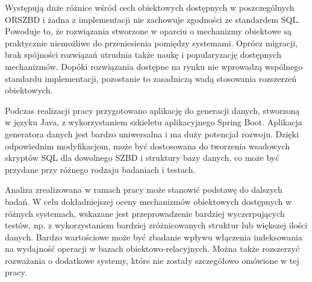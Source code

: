 \documentclass[a4paper,twoside,12pt]{book}
\begin{document}
Występują duże różnice wśród cech obiektowych dostępnych w poszczególnych ORSZBD i żadna z implementacji nie zachowuje zgodności ze standardem SQL. Powoduje to, że rozwiązania stworzone w oparciu o mechanizmy obiektowe są praktycznie niemożliwe do przeniesienia pomiędzy systemami. Oprócz migracji, brak spójności rozwiązań utrudnia także naukę i popularyzację dostępnych mechanizmów. Dopóki rozwiązania dostępne na rynku nie wprowadzą wspólnego standardu implementacji, pozostanie to zasadniczą wadą stosowania rozszerzeń obiektowych.

Podczas realizacji pracy przygotowano aplikację do generacji danych, stworzoną w języku Java, z wykorzystaniem szkieletu aplikacyjnego Spring Boot. Aplikacja generatora danych jest bardzo uniwersalna i ma duży potencjał rozwoju. Dzięki odpowiednim modyfikacjom, może być dostosowana do tworzenia wsadowych skryptów SQL dla dowolnego SZBD i struktury bazy danych, co może być przydane przy różnego rodzaju badaniach i testach.

Analiza zrealizowana w ramach pracy może stanowić podstawę do dalszych badań. W celu dokładniejszej oceny mechanizmów obiektowych dostępnych w różnych systemach, wskazane jest przeprowadzenie bardziej wyczerpujących testów, np. z wykorzystaniem bardziej zróżnicowanych struktur lub większej ilości danych. Bardzo wartościowe może być zbadanie wpływu włączenia indeksowania na wydajność operacji w bazach obiektowo-relacyjnych. Można także rozszerzyć rozważania o dodatkowe systemy, które nie zostały szczegółowo omówione w tej pracy.
\end{document}
